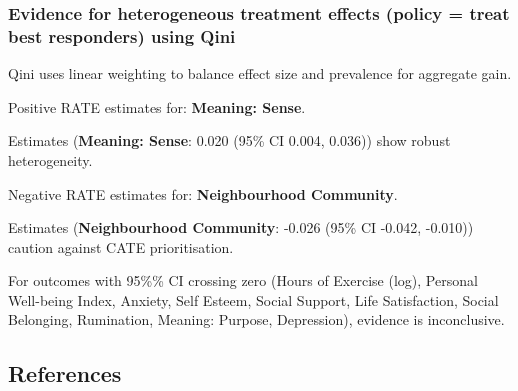 \documentclass[
  single column]{article}
\begin{document}
\subsubsection{Evidence for heterogeneous treatment effects (policy =
treat best responders) using
Qini}\label{evidence-for-heterogeneous-treatment-effects-policy-treat-best-responders-using-qini-1}

Qini uses linear weighting to balance effect size and prevalence for
aggregate gain.

Positive RATE estimates for: \textbf{Meaning: Sense}.

Estimates (\textbf{Meaning: Sense}: 0.020 (95\% CI 0.004, 0.036)) show
robust heterogeneity.

Negative RATE estimates for: \textbf{Neighbourhood Community}.

Estimates (\textbf{Neighbourhood Community}: -0.026 (95\% CI -0.042,
-0.010)) caution against CATE prioritisation.

For outcomes with 95\%\% CI crossing zero (Hours of Exercise (log),
Personal Well-being Index, Anxiety, Self Esteem, Social Support, Life
Satisfaction, Social Belonging, Rumination, Meaning: Purpose,
Depression), evidence is inconclusive.

\newpage{}

\subsection*{References}\label{references}
\end{document}
